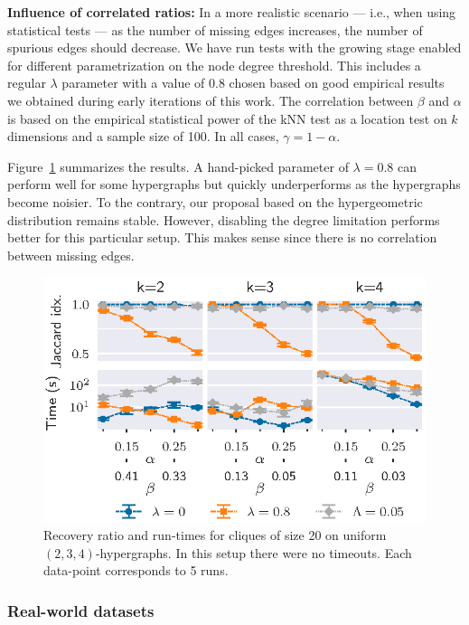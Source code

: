 \textbf{Influence of correlated ratios:}
In a more realistic scenario --- i.e., when using statistical tests --- as the number of missing edges
increases, the number of spurious edges should decrease.
We have run tests with the growing stage enabled for different parametrization on the node degree
threshold. This includes a regular $\lambda$ parameter with a value of $0.8$ chosen based on
good empirical results we obtained during early iterations of this work.
The correlation between $\beta$ and $\alpha$ is based on the empirical statistical power of the
kNN test as a location test on $k$ dimensions and a sample size of 100.
In all cases, $\gamma = 1 - \alpha$.

Figure~\ref{fig:hyper_ab_corr} summarizes the results. A hand-picked parameter of $\lambda = 0.8$ can
perform well for some hypergraphs but quickly underperforms as the hypergraphs become noisier.
To the contrary, our proposal based on the hypergeometric distribution remains stable.
However, disabling the degree limitation performs better for this particular setup.
This makes sense since there is no correlation between missing edges.

\begin{figure}[ht]
    \centering
    \includegraphics{images/5_presq/quasi_corr_20}
    \caption[Recovery ratio and run-times for cliques of size 20 on uniform $(2,3,4)$-hypergraphs.]{
    Recovery ratio and run-times for cliques of size 20 on uniform $(2,3,4)$-hypergraphs.
    In this setup there were no timeouts. Each data-point corresponds to 5 runs.
    }
    \label{fig:hyper_ab_corr}
\end{figure}

\subsubsection{Real-world datasets}
\label{sec:results_real}

